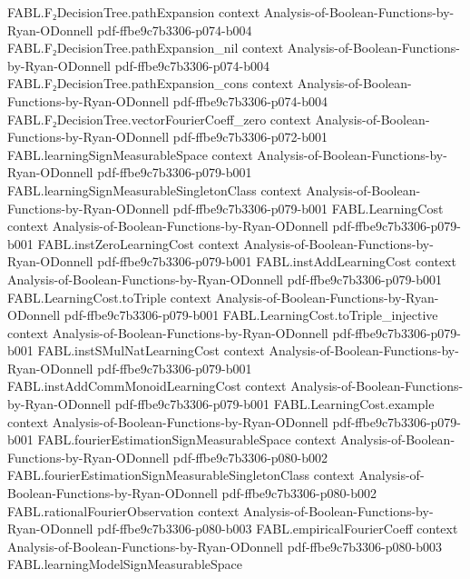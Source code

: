 \begin{theorem}
  {FABL.F₂DecisionTree.pathExpansion}
  {context}
  {Analysis-of-Boolean-Functions-by-Ryan-ODonnell}
  {pdf-ffbe9c7b3306-p074-b004}
\proofstep
  {FABL.F₂DecisionTree.pathExpansion_nil}
  {context}
  {Analysis-of-Boolean-Functions-by-Ryan-ODonnell}
  {pdf-ffbe9c7b3306-p074-b004}
\proofstep
  {FABL.F₂DecisionTree.pathExpansion_cons}
  {context}
  {Analysis-of-Boolean-Functions-by-Ryan-ODonnell}
  {pdf-ffbe9c7b3306-p074-b004}
\proofstep
  {FABL.F₂DecisionTree.vectorFourierCoeff_zero}
  {context}
  {Analysis-of-Boolean-Functions-by-Ryan-ODonnell}
  {pdf-ffbe9c7b3306-p072-b001}
\proofstep
  {FABL.learningSignMeasurableSpace}
  {context}
  {Analysis-of-Boolean-Functions-by-Ryan-ODonnell}
  {pdf-ffbe9c7b3306-p079-b001}
\proofstep
  {FABL.learningSignMeasurableSingletonClass}
  {context}
  {Analysis-of-Boolean-Functions-by-Ryan-ODonnell}
  {pdf-ffbe9c7b3306-p079-b001}
\proofstep
  {FABL.LearningCost}
  {context}
  {Analysis-of-Boolean-Functions-by-Ryan-ODonnell}
  {pdf-ffbe9c7b3306-p079-b001}
\proofstep
  {FABL.instZeroLearningCost}
  {context}
  {Analysis-of-Boolean-Functions-by-Ryan-ODonnell}
  {pdf-ffbe9c7b3306-p079-b001}
\proofstep
  {FABL.instAddLearningCost}
  {context}
  {Analysis-of-Boolean-Functions-by-Ryan-ODonnell}
  {pdf-ffbe9c7b3306-p079-b001}
\proofstep
  {FABL.LearningCost.toTriple}
  {context}
  {Analysis-of-Boolean-Functions-by-Ryan-ODonnell}
  {pdf-ffbe9c7b3306-p079-b001}
\proofstep
  {FABL.LearningCost.toTriple_injective}
  {context}
  {Analysis-of-Boolean-Functions-by-Ryan-ODonnell}
  {pdf-ffbe9c7b3306-p079-b001}
\proofstep
  {FABL.instSMulNatLearningCost}
  {context}
  {Analysis-of-Boolean-Functions-by-Ryan-ODonnell}
  {pdf-ffbe9c7b3306-p079-b001}
\proofstep
  {FABL.instAddCommMonoidLearningCost}
  {context}
  {Analysis-of-Boolean-Functions-by-Ryan-ODonnell}
  {pdf-ffbe9c7b3306-p079-b001}
\proofstep
  {FABL.LearningCost.example}
  {context}
  {Analysis-of-Boolean-Functions-by-Ryan-ODonnell}
  {pdf-ffbe9c7b3306-p079-b001}
\proofstep
  {FABL.fourierEstimationSignMeasurableSpace}
  {context}
  {Analysis-of-Boolean-Functions-by-Ryan-ODonnell}
  {pdf-ffbe9c7b3306-p080-b002}
\proofstep
  {FABL.fourierEstimationSignMeasurableSingletonClass}
  {context}
  {Analysis-of-Boolean-Functions-by-Ryan-ODonnell}
  {pdf-ffbe9c7b3306-p080-b002}
\proofstep
  {FABL.rationalFourierObservation}
  {context}
  {Analysis-of-Boolean-Functions-by-Ryan-ODonnell}
  {pdf-ffbe9c7b3306-p080-b003}
\proofstep
  {FABL.empiricalFourierCoeff}
  {context}
  {Analysis-of-Boolean-Functions-by-Ryan-ODonnell}
  {pdf-ffbe9c7b3306-p080-b003}
\proofstep
  {FABL.learningModelSignMeasurableSpace}

\end{theorem}
